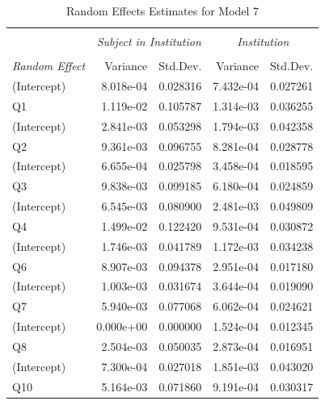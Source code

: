 \documentclass[11pt,a4paper]{report}
\begin{document}
\begin{table}
	\centering
\caption{Random Effects Estimates for Model 7}
\label{Table:RandomEffectsM7}
\begin{tabular}{@{\extracolsep{5pt}}lrrrr}
\hline \hline
 & & & & \\
& \multicolumn{2}{c}{\textit{Subject in Institution}} & \multicolumn{2}{c}{\textit{Institution}} \\
\cline{2-5}
 & & & &\\
\textit{Random Effect} & Variance & Std.Dev. & Variance & Std.Dev. \\[0.1cm]
\hline
(Intercept) & 8.018e-04  & 0.028316          	&7.432e-04 &0.027261 \\      
Q1         & 1.119e-02  & 0.105787 		      &1.314e-03 &0.036255 \\[0.3cm]

(Intercept) & 2.841e-03  & 0.053298            &1.794e-03 &0.042358 \\     
Q2          & 9.361e-03  & 0.096755      &8.281e-04 &0.028778 \\[0.3cm]

(Intercept) & 6.655e-04  & 0.025798            &3.458e-04 &0.018595 \\      
Q3          & 9.838e-03  & 0.099185      &6.180e-04 &0.024859 \\[0.3cm]

(Intercept) & 6.545e-03  & 0.080900          	&2.481e-03 &0.049809 \\   
Q4         & 1.499e-02  & 0.122420     	&9.531e-04 &0.030872 \\[0.3cm]

(Intercept) & 1.746e-03  & 0.041789            &1.172e-03 &0.034238 \\
Q6         & 8.907e-03  & 0.094378    	&2.951e-04 &0.017180 \\[0.3cm]

(Intercept) & 1.003e-03  & 0.031674          	&3.644e-04 &0.019090 \\     
Q7          & 5.940e-03  & 0.077068      &6.062e-04 &0.024621 \\[0.3cm]

(Intercept) & 0.000e+00  & 0.000000            &1.524e-04 &0.012345 \\   
Q8          & 2.504e-03  & 0.050035        &2.873e-04 &0.016951 \\[0.3cm]

(Intercept) & 7.300e-04  & 0.027018            &1.851e-03 &0.043020 \\ 
Q10         & 5.164e-03  & 0.071860      &9.191e-04 &0.030317 \\[0.3cm]


\end{tabular}
\end{table}
\end{document}
